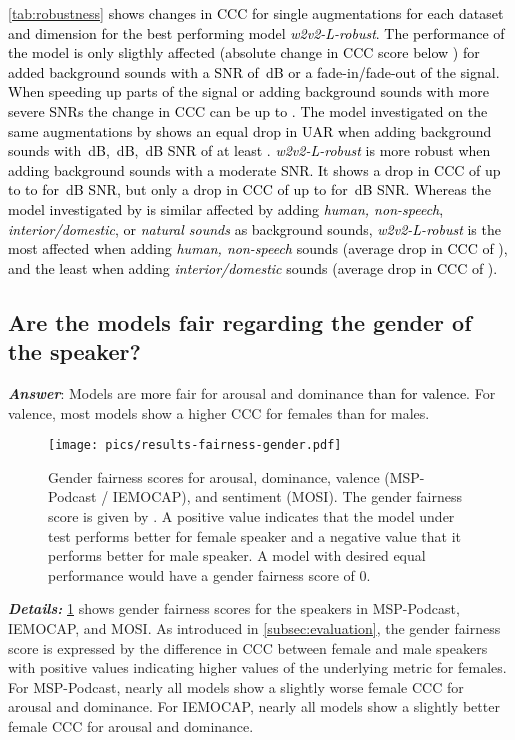\documentclass{article}
\newcommand\wrobust{\mbox{\emph{w2v2-L-robust}}}
\newcommand{\review}[1]{\textcolor{black}{#1}}
\newcommand\msppodcast{\mbox{MSP-Podcast}}
\newcommand\iemocap{\mbox{IEMOCAP}}
\newcommand\mosi{\mbox{MOSI}}
\begin{document}
\review{
\cref{tab:robustness} shows changes in \ac{CCC} for single augmentations
for each dataset and dimension
for the best performing model {\wrobust}.
The performance of the model is only sligthly affected
(absolute change in \ac{CCC} score below )
for added background sounds with a \ac{SNR} of \,dB
or a fade-in/fade-out of the signal.
When speeding up parts of the signal or adding background sounds
with more severe \acp{SNR}
the change in \ac{CCC} can be up to .
The model investigated on the same augmentations
by \citet{jaiswal2021robustness}
shows an equal drop in \ac{UAR}
when adding background sounds
with \,dB, \,dB, \,dB \ac{SNR}
of at least .
{\wrobust} is more robust when adding
background sounds with a moderate \ac{SNR}.
It shows a drop in \ac{CCC} of up to to  for \,dB SNR,
but only a drop in \ac{CCC} of up to  for \,dB SNR.
Whereas the model investigated by \citet{jaiswal2021robustness}
is similar affected by adding
\emph{human, non-speech}, \emph{interior/domestic}, or \emph{natural sounds}
as background sounds,
{\wrobust} is the most affected when adding \emph{human, non-speech} sounds (average drop in \ac{CCC} of ),
and the least when adding \emph{interior/domestic} sounds
(average drop in \ac{CCC} of ).
}





\subsection{Are the models fair regarding the gender of the speaker?}
\label{subsec:fairness}

\emph{\textbf{Answer}}:
Models are \review{more} fair for arousal and dominance
\review{than for valence}.
For valence,
most models show a higher \ac{CCC} for females than for males.


\begin{figure}[t]
    \centering
    \texttt{[image: pics/results-fairness-gender.pdf]}
    \caption{Gender fairness scores for arousal, dominance, valence ({\msppodcast} / {\iemocap}), and sentiment ({\mosi}). The gender fairness score is given by . A positive value indicates that the model under test performs better for female speaker and a negative value that it performs better for male speaker. A model with desired equal performance would have a gender fairness score of 0.
    }
    \label{fig:fairness}
\end{figure}

\noindent
\emph{\textbf{Details:}}
\cref{fig:fairness} shows gender fairness scores
for the speakers in {\msppodcast}, {\iemocap}, and {\mosi}.
As introduced in \cref{subsec:evaluation},
the gender fairness score is expressed
by the difference in \ac{CCC} between female and male speakers
with positive values indicating higher values of the underlying metric for females.
For {\msppodcast},
nearly all models show a slightly worse female \ac{CCC} for arousal and dominance. 
For {\iemocap},
nearly all models show a slightly better female \ac{CCC} for arousal and dominance.
\end{document}
